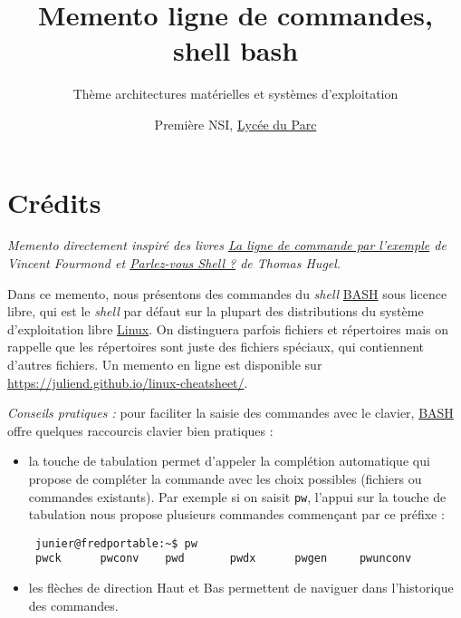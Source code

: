 \documentclass[
  11pt,
]{article}
\title{Memento ligne de commandes, shell bash}
\subtitle{Thème architectures matérielles et systèmes d'exploitation}
\author{Première NSI, \href{https://frederic-junier.org/}{Lycée du Parc}}
\date{}
\newcounter{prop}
\newcounter{histo}
\begin{document}
\maketitle

\renewcommand*\contentsname{Table des matières}
{
\hypersetup{linkcolor=}
\setcounter{tocdepth}{3}
\tableofcontents
}
\hypertarget{cruxe9dits}{%
\section*{Crédits}\label{cruxe9dits}}

\emph{Memento directement inspiré des livres
\href{https://www.eyrolles.com/Informatique/Livre/la-ligne-de-commande-par-l-exemple-9782351410721/}{La
ligne de commande par l'exemple} de Vincent Fourmond et
\href{https://www.eyrolles.com/Informatique/Livre/parlez-vous-shell--9782729877590/}{Parlez-vous
Shell ?} de Thomas Hugel.}

Dans ce memento, nous présentons des commandes du \emph{shell}
\href{https://fr.wikipedia.org/wiki/Bourne-Again_shell}{BASH} sous
licence libre, qui est le \emph{shell} par défaut sur la plupart des
distributions du système d'exploitation libre
\href{https://fr.wikipedia.org/wiki/Linux}{Linux}. On distinguera
parfois fichiers et répertoires mais on rappelle que les répertoires
sont juste des fichiers spéciaux, qui contiennent d'autres fichiers. Un
memento en ligne est disponible sur
\url{https://juliend.github.io/linux-cheatsheet/}.

\emph{Conseils pratiques :} pour faciliter la saisie des commandes avec
le clavier,
\href{https://fr.wikipedia.org/wiki/Bourne-Again_shell}{BASH} offre
quelques raccourcis clavier bien pratiques :

\begin{itemize}
\item
  la touche de tabulation permet d'appeler la complétion automatique qui
  propose de compléter la commande avec les choix possibles (fichiers ou
  commandes existants). Par exemple si on saisit \texttt{pw}, l'appui
  sur la touche de tabulation nous propose plusieurs commandes
  commençant par ce préfixe :

\begin{verbatim}
 junier@fredportable:~$ pw
 pwck      pwconv    pwd       pwdx      pwgen     pwunconv 
\end{verbatim}
\item
  les flèches de direction Haut et Bas permettent de naviguer dans
  l'historique des commandes.
\end{itemize}
\end{document}

